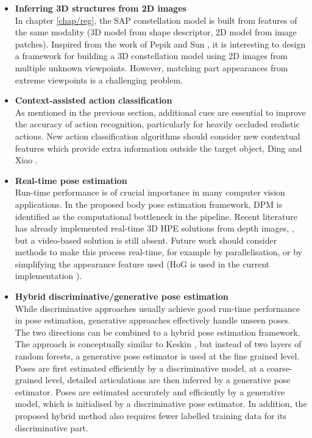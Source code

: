 \begin{itemize}
	\item \textbf{Inferring 3D structures from 2D images} \\  
	In chapter \ref{chap/reg}, the SAP constellation model is built from features of the same modality (3D model from shape descriptor, 2D model from image patches). Inspired from the work of Pepik \etal \cite{Pepik2012} and Sun \etal \cite{Sun2009}, it is interesting to design a framework for building a 3D constellation model using 2D images from multiple unknown viewpoints. However, matching part appearances from extreme viewpoints is a challenging problem.  
	\item \textbf{Context-assisted action classification} \\ 
	As mentioned in the previous section, additional cues are essential to improve the accuracy of action recognition, particularly for heavily occluded realistic actions. New action classification algorithms should consider new contextual features which provide extra information outside the target object, \eg Ding and Xiao \cite{Ding2012}.   
	\item \textbf{Real-time pose estimation}\\ 
	Run-time performance is of crucial importance in many computer vision applications. In the proposed body pose estimation framework, DPM is identified as the computational bottleneck in the pipeline. 
	Recent literature has already implemented real-time 3D HPE solutions from depth images, \eg \cite{Baak2011, Girshick2011, Sun2012}, but a video-based solution is still absent.  
	Future work should consider methods to make this process real-time, for example by parallelisation, or by simplifying the appearance feature used (HoG is used in the current implementation \cite{Yang2011}).  
	\item \textbf{Hybrid discriminative/generative pose estimation}\\
	While discriminative approaches usually achieve good run-time performance in pose estimation, generative approaches effectively handle unseen poses. The two directions can be combined to a hybrid pose estimation framework. The approach is conceptually similar to Keskin \etal \cite{Keskin2012}, but instead of two layers of random forests, a generative pose estimator is used at the fine grained level. Poses are first estimated efficiently by a discriminative model, at a coarse-grained level, detailed articulations are then inferred by a generative pose estimator. Poses are estimated accurately and efficiently by a generative model, which is initialised by a discriminative pose estimator. In addition, the proposed hybrid method also requires fewer labelled training data for its discriminative part. 

\end{itemize}
